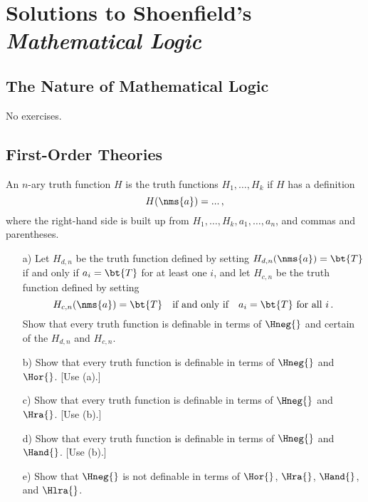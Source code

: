 \chapter{Solutions to Shoenfield's \emph{Mathematical Logic}}

\section{The Nature of Mathematical Logic}

No exercises.


\section{First-Order Theories}

\begin{exercise}
	An $n$-ary truth function $H$ is  the 
	truth functions $H_1, \dots, H_k$ if $H$ has a definition
	\[
		H(\nms{a}) = ...\,,
	\]
	where the right-hand side is built up from $H_1, \dots, H_k, 
	a_1, \dots, a_n$, and commas and parentheses.
	\begin{enumerate}
		\item[a)] Let $H_{d,n}$ be the truth function defined by 
		setting $H_{d,n}(\nms{a}) = \bt{T}$ if and only if $a_i = 
		\bt{T}$ for at least one $i$, and let $H_{c,n}$ be the 
		truth function defined by setting
		\[
			H_{c,n}(\nms{a}) = \bt{T}
			\quad
			\text{if and only if}
			\quad 
			a_i = \bt{T} \text{ for all } i\,.
		\]
		Show that every truth function is definable in terms of 
		$\Hneg{}$ and certain of the $H_{d,n}$ and $H_{c,n}$.
		
		\item[b)] Show that every truth function is definable in 
		terms of $\Hneg{}$ and $\Hor{}$. [Use (a).]
		
		\item[c)] Show that every truth function is definable in 
		terms of $\Hneg{}$ and $\Hra{}$. [Use (b).]
		
		\item[d)] Show that every truth function is definable in 
		terms of $\Hneg{}$ and $\Hand{}$. [Use (b).]
		
		\item[e)] Show that $\Hneg{}$ is not definable in terms of 
		$\Hor{}$, $\Hra{}$, $\Hand{}$, and $\Hlra{}$.
	\end{enumerate}
\end{exercise}


